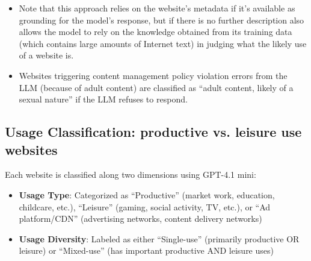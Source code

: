 \documentclass[12pt]{article}
\begin{document}
\begin{enumerate}
\begin{itemize}
\begin{verbatim}
Return your response in this exact JSON format:
{{
    "website_description": "Description of the website's nature and primary function",
    "top_activities": [
        "Activity 1",
        "Activity 2",
        "Activity 3",
        "Activity 4",
        "Activity 5"
    ]
}}

If the domain name alone doesn't provide enough information for a confident assessment, make reasonable inferences based on similar websites.
\end{verbatim}

\item Note that this approach relies on the website's metadata if it's available as grounding for the model's response, but if there is no further description also allows the model to rely on the knowledge obtained from its training data (which contains large amounts of Internet text) in judging what the likely use of a website is.
  \item Websites triggering content management policy violation errors from the LLM (because of adult content) are classified as ``adult content, likely of a sexual nature'' if the LLM refuses to respond.
    \end{itemize}

\end{enumerate}

\subsection*{Usage Classification: productive vs. leisure use websites}

 Each website is classified along two dimensions using GPT-4.1 mini:
    \begin{itemize}
        \item \textbf{Usage Type}: Categorized as ``Productive'' (market work, education, childcare, etc.), ``Leisure'' (gaming, social activity, TV, etc.), or ``Ad platform/CDN'' (advertising networks, content delivery networks)
        \item \textbf{Usage Diversity}: Labeled as either ``Single-use'' (primarily productive OR leisure) or ``Mixed-use'' (has important productive AND leisure uses)
    \end{itemize}
\end{document}
